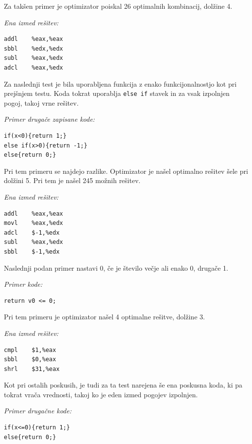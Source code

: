 \documentclass[a4paper, 12pt]{book}
\begin{document}
	Za takšen primer je optimizator poiskal 26 optimalnih kombinacij, dolžine 4.

\medskip

\noindent
{\it Ena izmed rešitev:}
\begin{Verbatim}[baselinestretch=1]
addl    %eax,%eax
sbbl    %edx,%edx
subl    %eax,%edx
adcl    %eax,%edx
\end{Verbatim}

Za naslednji test je bila uporabljena funkcija z enako funkcijonalnostjo kot pri prejšnjem testu. Koda tokrat uporablja \texttt{else if} stavek in za vsak izpolnjen pogoj, takoj vrne rešitev.


\medskip

\noindent
{\it Primer drugače zapisane kode:}
\begin{Verbatim}[baselinestretch=1]
if(x<0){return 1;}
else if(x>0){return -1;}
else{return 0;}
\end{Verbatim}

Pri tem primeru se najdejo razlike. Optimizator je našel optimalno rešitev šele pri dolžini 5. Pri tem je našel 245 možnih rešitev.

\medskip

\noindent
{\it Ena izmed rešitev:}
\begin{Verbatim}[baselinestretch=1]
addl    %eax,%eax
movl    %eax,%edx
adcl    $-1,%edx
subl    %eax,%edx
sbbl    $-1,%edx
\end{Verbatim}

Naslednji podan primer nastavi 0, če je število večje ali enako 0, drugače 1.

\medskip

\noindent
{\it Primer kode:}
\begin{Verbatim}[baselinestretch=1]
return v0 <= 0;
\end{Verbatim}

Pri tem primeru je optimizator našel 4 optimalne rešitve, dolžine 3.

\medskip

\noindent
{\it Ena izmed rešitev:}
\begin{Verbatim}[baselinestretch=1]
cmpl    $1,%eax
sbbl    $0,%eax
shrl    $31,%eax
\end{Verbatim}

Kot pri ostalih poskusih, je tudi za ta test narejena še ena poskusna koda, ki pa tokrat vrača vrednosti, takoj ko je eden izmed pogojev izpolnjen.

\medskip

\noindent
{\it Primer drugačne kode:}
\begin{Verbatim}[baselinestretch=1]
if(x<=0){return 1;}
else{return 0;}
\end{Verbatim}
\end{document}
